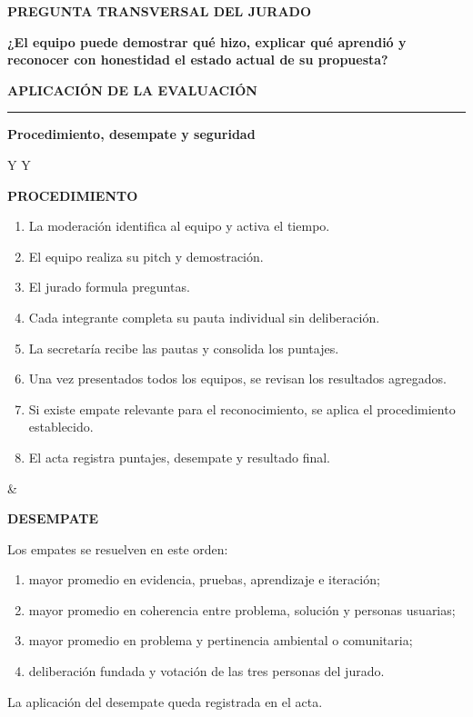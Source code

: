 \documentclass[10pt,a4paper]{article}
\newcommand{\kicker}[1]{%
  {\color{AIEPRed}\scriptsize\bfseries\MakeUppercase{#1}}\par\vspace{2.4mm}
  {\color{AIEPRed}\rule{13mm}{1.2pt}}\vspace{3mm}
}
\newcommand{\labeltext}[1]{%
  {\scriptsize\bfseries\color{AIEPSlate}\MakeUppercase{#1}}\par\vspace{1.2mm}
}
\begin{document}
\begin{card}
\labeltext{Pregunta transversal del jurado}
{\large\bfseries\color{AIEPNavy}
¿El equipo puede demostrar qué hizo, explicar qué aprendió y reconocer con honestidad el estado
actual de su propuesta?}
\end{card}

\newpage
\kicker{Aplicación de la evaluación}
{\LARGE\bfseries\color{AIEPNavy} Procedimiento, desempate y seguridad}\par
\vspace{4mm}

\begin{tabularx}{\textwidth}{Y Y}
\begin{card}[height=105mm,valign=top]
\labeltext{Procedimiento}
\begin{enumerate}
  \item La moderación identifica al equipo y activa el tiempo.
  \item El equipo realiza su pitch y demostración.
  \item El jurado formula preguntas.
  \item Cada integrante completa su pauta individual sin deliberación.
  \item La secretaría recibe las pautas y consolida los puntajes.
  \item Una vez presentados todos los equipos, se revisan los resultados agregados.
  \item Si existe empate relevante para el reconocimiento, se aplica el procedimiento establecido.
  \item El acta registra puntajes, desempate y resultado final.
\end{enumerate}
\end{card}
&
\begin{card}[height=105mm,valign=top]
\labeltext{Desempate}
Los empates se resuelven en este orden:
\begin{enumerate}
  \item mayor promedio en evidencia, pruebas, aprendizaje e iteración;
  \item mayor promedio en coherencia entre problema, solución y personas usuarias;
  \item mayor promedio en problema y pertinencia ambiental o comunitaria;
  \item deliberación fundada y votación de las tres personas del jurado.
\end{enumerate}
\vspace{3mm}
La aplicación del desempate queda registrada en el acta.
\end{card}
\end{tabularx}
\end{document}
